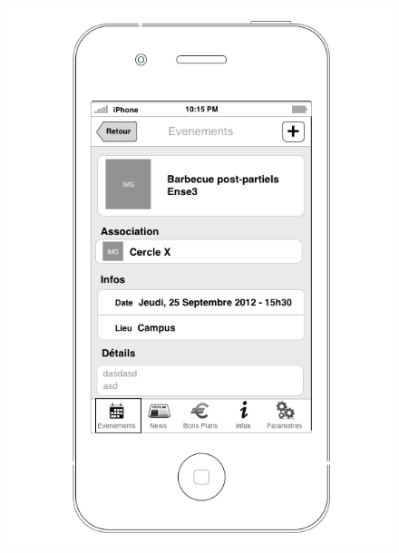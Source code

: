 \documentclass[a4paper, 11px]{article}
\begin{document}
\begin{figure}[htbp]
	\begin{minipage}[c]{.50\linewidth}
		\begin{center}
			\includegraphics[scale=0.3]{../../Sketch/iOS/evenements_detail.png}
		\end{center}
	\end{minipage}
	\hfill
	\begin{minipage}[c]{.50\linewidth}
		\begin{center}

\end{center}
\end{minipage}
\end{figure}
\end{document}

